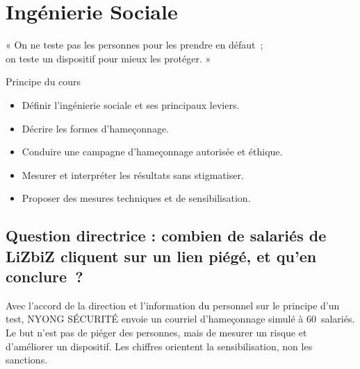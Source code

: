 
\chapter{Ingénierie Sociale}
\label{chap:social}

\epigraph{%
    « On ne teste pas les personnes pour les prendre en défaut~;\\
    on teste un dispositif pour mieux les protéger. »%
}{Principe du cours}


\begin{boxobjectifs}
\begin{itemize}
    \item Définir l'ingénierie sociale et ses principaux leviers.
    \item Décrire les formes d'hameçonnage.
    \item Conduire une campagne d'hameçonnage autorisée et éthique.
    \item Mesurer et interpréter les résultats sans stigmatiser.
    \item Proposer des mesures techniques et de sensibilisation.
\end{itemize}
\end{boxobjectifs}

\bigskip

\section*{Question directrice : combien de salariés de LiZbiZ cliquent sur un lien piégé, et qu'en conclure~?}

Avec l'accord de la direction et l'information du personnel sur le principe
d'un test, NYONG SÉCURITÉ envoie un courriel d'hameçonnage simulé à
60~salariés. Le but n'est pas de piéger des personnes, mais de mesurer un
risque et d'améliorer un dispositif. Les chiffres orientent la
sensibilisation, non les sanctions.

